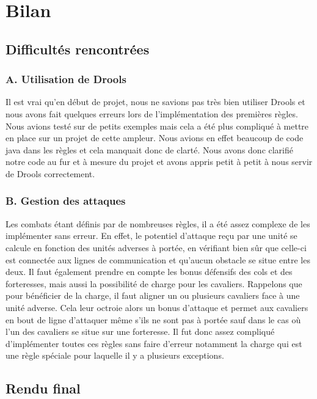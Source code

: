 \chapter{Bilan}

	\section{Difficultés rencontrées}   

		\subsection{A. Utilisation de Drools}
		Il est vrai qu'en début de projet, nous ne savions pas très bien utiliser Drools et nous avons fait quelques erreurs lors de l'implémentation des premières règles. 
		Nous avions testé sur de petits exemples mais cela a été plus compliqué à mettre en place sur un projet de cette ampleur. Nous avions en effet beaucoup de code java 
		dans les règles et cela manquait donc de clarté. Nous avons donc clarifié notre code au fur et à mesure du projet et avons appris petit à petit à nous servir de 
		Drools correctement. 
		
		\subsection{B. Gestion des attaques}
		Les combats étant définis par de nombreuses règles, il a été assez complexe de les implémenter sans erreur.
		En effet, le potentiel d'attaque reçu par une unité se calcule en fonction des unités adverses à portée, en vérifiant bien sûr que celle-ci est connectée aux lignes
		de communication et qu'aucun obstacle se situe entre les deux.
		Il faut également prendre en compte les bonus défensifs des cols et des forteresses, mais aussi la possibilité de charge pour les cavaliers.
		Rappelons que pour bénéficier de la charge, il faut aligner un ou plusieurs cavaliers face à une unité adverse.
		Cela leur octroie alors un bonus d'attaque et permet aux cavaliers en bout de ligne d'attaquer même s'ils ne sont pas à portée sauf dans le cas où l'un des cavaliers
		se situe sur une forteresse.
		Il fut donc assez compliqué d'implémenter toutes ces règles sans faire d'erreur notamment la charge qui est une règle spéciale pour laquelle il y a
		plusieurs exceptions.
		
	\section{Rendu final}
	
